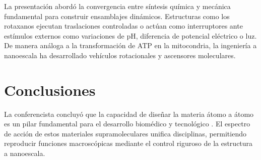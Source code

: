 \documentclass[pdflatex,sn-mathphys-num]{sn-jnl}
\theoremstyle{thmstyleone}%
\theoremstyle{thmstyletwo}%
\theoremstyle{thmstylethree}%
\begin{document}
La presentación abordó la convergencia entre síntesis química y
mecánica fundamental para construir ensamblajes dinámicos.
Estructuras como los rotaxanos ejecutan traslaciones controladas o actúan
como interruptores ante estímulos externos como variaciones de pH, diferencia de
potencial eléctrico o luz.
De manera análoga a la transformación de ATP en la
mitocondria, la ingeniería a nanoescala ha desarrollado
vehículos rotacionales y ascensores moleculares.

\section{Conclusiones}
\label{sec:conclusion}

La conferencista concluyó que la capacidad de diseñar la materia átomo a
átomo es un pilar fundamental para el desarrollo biomédico y tecnológico
. El espectro de acción de estos materiales supramoleculares
unifica disciplinas, permitiendo reproducir funciones macroscópicas
mediante el control riguroso de la estructura a nanoescala.
\end{document}
